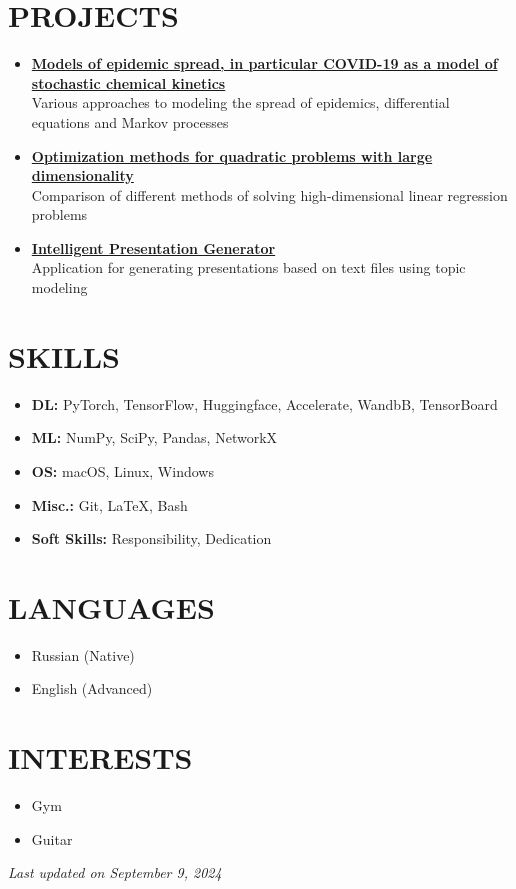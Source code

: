 \documentclass[11pt,a4paper]{moderncv}
\begin{document}
\section{PROJECTS}
\begin{itemize}
    \item \href{https://github.com/kisnikser/Epidemic-Spread-Models}{\textbf{Models of epidemic spread, in particular COVID-19 as a model of stochastic chemical kinetics}}\\
    Various approaches to modeling the spread of epidemics, differential equations and Markov processes
    \item \href{https://github.com/kisnikser/Optimization-Methods}{\textbf{Optimization methods for quadratic problems with large dimensionality}}\\
    Comparison of different methods of solving high-dimensional linear regression problems
    \item \href{https://github.com/kisnikser/Intelligent-Presentation-Generator}{\textbf{Intelligent Presentation Generator}}\\
    Application for generating presentations based on text files using topic modeling
\end{itemize}

\section{SKILLS}
\begin{itemize}
    \item \textbf{DL:} PyTorch, TensorFlow, Huggingface, Accelerate, WandbB, TensorBoard
    \item \textbf{ML:} NumPy, SciPy, Pandas, NetworkX
    \item \textbf{OS:} macOS, Linux, Windows
    \item \textbf{Misc.:} Git, \LaTeX, Bash
    \item \textbf{Soft Skills:} Responsibility, Dedication
\end{itemize}

\section{LANGUAGES}
\begin{itemize}
    \item Russian (Native)
    \item English (Advanced)
\end{itemize}

\section{INTERESTS}
\begin{itemize}
    \item Gym
    \item Guitar
\end{itemize}

\vspace{\fill}
\begin{center}
\textit{Last updated on September 9, 2024}
\end{center}
\vspace{-3.0cm}
\end{document}
